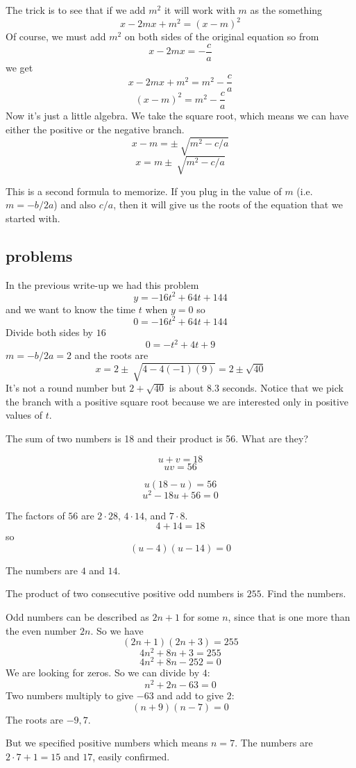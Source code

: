 \documentclass[11pt, oneside]{article}
\begin{document}
The trick is to see that if we add $m^2$ it will work with $m$ as the something
\[ x - 2mx + m^2 = (x - m)^2 \]
Of course, we must add $m^2$ on both sides of the original equation so from
\[ x - 2mx = - \frac{c}{a} \]
we get
\[ x - 2mx + m^2 = m^2 - \frac{c}{a} \]
\[ (x - m)^2 = m^2 - \frac{c}{a} \]
Now it's just a little algebra.  We take the square root, which means we can have either the positive or the negative branch.
\[ x - m = \pm \ \sqrt{m^2 - c/a} \]
\[ x = m \pm \ \sqrt{m^2 - c/a} \]

This is a second formula to memorize.  If you plug in the value of $m$ (i.e. $m = -b/2a$) and also $c/a$, then it will give us the roots of the equation that we started with.

\subsection*{problems}
In the previous write-up we had this problem
\[ y = -16t^2 + 64t + 144 \]
and we want to know the time $t$ when $y = 0$ so
\[ 0 = -16t^2 + 64t + 144 \]
Divide both sides by $16$
\[ 0 = -t^2 + 4t + 9 \]
$m = -b/2a = 2$ and the roots are
\[ x = 2 \pm \ \sqrt{4 - 4(-1)(9)} = 2 \pm \sqrt{40} \]
It's not a round number but $2 + \sqrt{40}$ is about $8.3$ seconds.  Notice that we pick the branch with a positive square root because we are interested only in positive values of $t$.

The sum of two numbers is 18 and their product is 56.  What are they?

\[ u + v = 18 \]
\[ uv = 56 \]

\[ u(18 - u) = 56 \]
\[ u^2 - 18u + 56 = 0 \]

The factors of $56$ are $2 \cdot 28$, $4 \cdot 14$, and $7 \cdot 8$.
\[ 4 + 14 = 18 \]
so
\[ (u - 4)(u - 14) = 0 \]

The numbers are $4$ and $14$.

The product of two consecutive positive odd numbers is $255$.  Find the numbers.

Odd numbers can be described as $2n+1$ for some $n$, since that is one more than the even number $2n$.  So we have
\[ (2n + 1)(2n + 3) = 255 \]
\[ 4n^2 + 8n + 3 = 255 \]
\[ 4n^2 + 8n - 252 = 0 \]
We are looking for zeros.  So we can divide by $4$:
\[ n^2 + 2n - 63 = 0 \]
Two numbers multiply to give $-63$ and add to give $2$:
\[ (n + 9)(n - 7) = 0 \]
The roots are $-9, 7$.  

But we specified positive numbers which means $n = 7$.  The numbers are $2 \cdot 7 + 1 = 15$ and $17$, easily confirmed.
\end{document}
